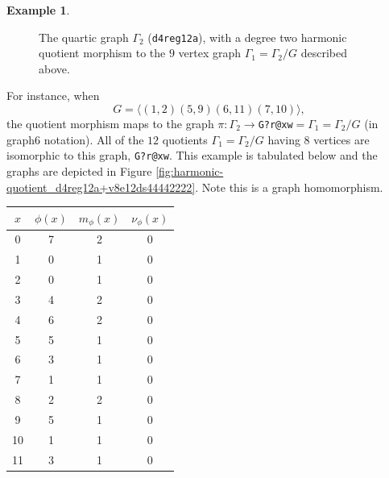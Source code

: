 \documentclass[12pt,letterpaper]{article}
\theoremstyle{definition}
\newtheorem{example}[theorem]{Example}
\begin{document}
\begin{example}
{\begin{figure}[H]
\begin{minipage}{\textwidth}
\begin{center}
%
\end{center}
\end{minipage}
\caption{The quartic graph $\Gamma_2$ ({\tt d4reg12a}), with a degree two harmonic quotient morphism to the $9$ vertex graph $\Gamma_1=\Gamma_2/G$ described above.}
\label{fig:harmonic-quotient_d4reg12a+v9e12ds444222222}
\end{figure}

For instance, when
\[
G = \langle  (1,2)(5,9)(6,11)(7,10) \rangle ,
\]
the quotient morphism maps to the graph
$\pi: \Gamma_2\to $\verb+G?r@xw+$=\Gamma_1=\Gamma_2/G $ (in graph6 notation).
All of the $12$ quotients $\Gamma_1=\Gamma_2/G$ having $8$ vertices
are isomorphic to this graph, \verb+G?r@xw+.
This example
is tabulated below and the graphs are depicted in
Figure \ref{fig:harmonic-quotient_d4reg12a+v8e12ds44442222}. 
Note this is a graph homomorphism.

\begin{center}
\begin{tabular}{c|c|c|c}  
  $x$ & $\phi(x)$ & $m_\phi(x)$ & $\nu_\phi(x)$ \\ \hline
  0   &    7   &        2         &  0   \\ 
  1   &    0   &        1         &  0  \\ 
  2   &    0   &        1         &  0  \\ 
  3   &    4   &        2         &  0  \\ 
  4   &    6   &        2         &  0   \\
  5   &    5   &        1         &  0   \\
  6   &    3   &        1         &  0   \\
  7   &    1   &        1         &  0   \\
  8   &    2   &        2         &  0   \\
  9   &    5   &        1         &  0   \\
  10   &   1   &        1         &  0  \\   
  11   &   3   &        1         &  0  \\
\end{tabular}
\end{center}

}
\end{example}
\end{document}
